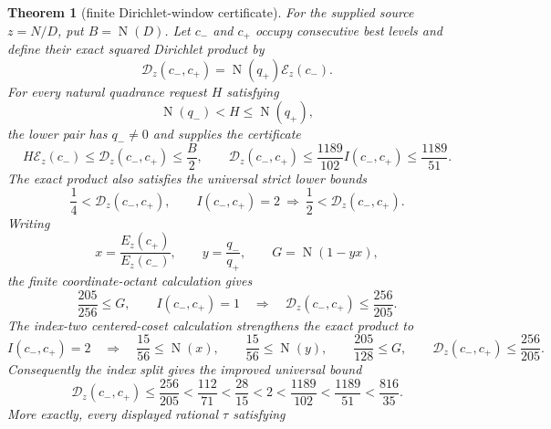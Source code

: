 \documentclass[11pt]{article}
\newtheorem{theorem}{Theorem}[section]
\newcommand{\Norm}[1]{\operatorname{N}\!\left(#1\right)}
\begin{document}
\begin{theorem}[finite Dirichlet-window certificate]
\label{thm:finite-dirichlet-window}
For the supplied source $z=N/D$, put $B=\Norm D$.  Let $c_-$ and $c_+$
occupy consecutive best levels and define their exact
squared Dirichlet product by
\begin{equation}
\label{eq:dirichlet-window-product}
 \mathcal D_z(c_-,c_+)
   =\Norm{q_+}\mathcal E_z(c_-).
\end{equation}
For every natural quadrance request $H$ satisfying
\begin{equation}
\label{eq:dirichlet-window-request}
                 \Norm{q_-}<H\le\Norm{q_+},
\end{equation}
the lower pair has $q_-\ne0$ and supplies the certificate
\begin{equation}
\label{eq:dirichlet-window-bound}
 H\mathcal E_z(c_-)
   \le\mathcal D_z(c_-,c_+)
   \le\frac{B}{2},
 \qquad
 \mathcal D_z(c_-,c_+)\le\frac{1189}{102}I(c_-,c_+)
    \le\frac{1189}{51}.
\end{equation}
The exact product also satisfies the universal strict lower bounds
\begin{equation}
\label{eq:dirichlet-window-lower}
 \frac14<\mathcal D_z(c_-,c_+),
 \qquad
 I(c_-,c_+)=2\ \Longrightarrow\
 \frac12<\mathcal D_z(c_-,c_+).
\end{equation}
Writing
\[
 x=\frac{E_z(c_+)}{E_z(c_-)},\qquad
 y=\frac{q_-}{q_+},\qquad G=\Norm{1-yx},
\]
the finite coordinate-octant calculation gives
\begin{equation}
\label{eq:finite-octant-window-upper}
 \frac{205}{256}\le G,
 \qquad
 I(c_-,c_+)=1\quad\Longrightarrow\quad
 \mathcal D_z(c_-,c_+)\le\frac{256}{205}.
\end{equation}
The index-two centered-coset calculation strengthens the exact product to
\begin{equation}
\label{eq:index-two-window-upper}
 I(c_-,c_+)=2\quad\Longrightarrow\quad
 \frac{15}{56}\le\Norm x,\qquad
 \frac{15}{56}\le\Norm y,\qquad
 \frac{205}{128}\le G,\qquad
 \mathcal D_z(c_-,c_+)\le\frac{256}{205}.
\end{equation}
Consequently the index split gives the improved universal bound
\begin{equation}
\label{eq:index-aware-window-bound}
 \mathcal D_z(c_-,c_+)\le\frac{256}{205}
   <\frac{112}{71}<\frac{28}{15}<2<\frac{1189}{102}
   <\frac{1189}{51}<\frac{816}{35}.
\end{equation}
More exactly, every displayed rational $\tau$ satisfying
\begin{equation}

\end{equation}
\end{theorem}
\end{document}
